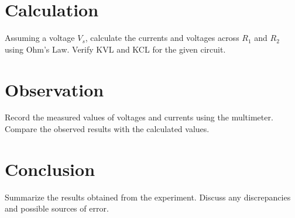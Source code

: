 \documentclass[a4paper,12pt]{article}
\begin{document}
\section{Calculation}
Assuming a voltage $V_s$, calculate the currents and voltages across $R_1$ and $R_2$ using Ohm's Law. Verify KVL and KCL for the given circuit.

\section{Observation}
Record the measured values of voltages and currents using the multimeter. Compare the observed results with the calculated values.

\section{Conclusion}
Summarize the results obtained from the experiment. Discuss any discrepancies and possible sources of error.
\end{document}

